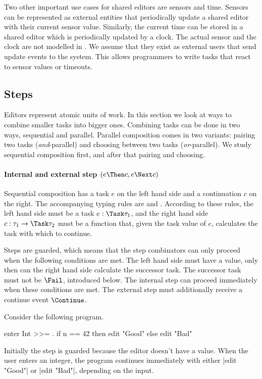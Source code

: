\label{sub:time}
Two other important use cases for shared editors are sensors and time.
Sensors can be represented as external entities that periodically update a shared editor with their current sensor value.
Similarly, the current time can be stored in a shared editor which is periodically updated by a clock.
The actual sensor and the clock are not modelled in \TOPHAT.
We assume that they exist as external users that send update events to the system.
This allows programmers to write tasks that react to sensor values or timeouts.


\subsection{Steps}

Editors represent atomic units of work.
In this section we look at ways to combine smaller tasks into bigger ones.
Combining tasks can be done in two ways, sequential and parallel.
Parallel composition comes in two variants: pairing two tasks (\emph{and}-parallel) and choosing between two tasks (\emph{or}-parallel).
We study sequential composition first, and after that pairing and choosing.


\paragraph{Internal and external step $(e \Then c, e \Next c)$}
\label{sub:steps}

Sequential composition has a task $e$ on the left hand side and a continuation $c$ on the right.
The accompanying typing rules are  and .
According to these rules, the left hand side must be a task $e : \Task \tau_1$, and the right hand side $c : \tau_1 \to \Task \tau_2$ must be a function that, given the task value of $e$, calculates the task with which to continue.

Steps are guarded, which means that the step combinators can only proceed when the following conditions are met.
The left hand side must have a value, only then can the right hand side calculate the successor task.
The successor task must not be $\Fail$, introduced below.
The internal step can proceed immediately when these conditions are met.
The external step must additionally receive a continue event $\Continue$.


\begin{example}
\label{exm:conditions}

Consider the following program.
\begin{TASK}
  enter Int >>= \n. if n == 42 then edit "Good" else edit "Bad"
\end{TASK}
Initially the step is guarded because the editor doesn't have a value.
When the user enters an integer, the program continues immediately with either \TS|edit "Good"| or \TS|edit "Bad"|, depending on the input.

\end{example}




